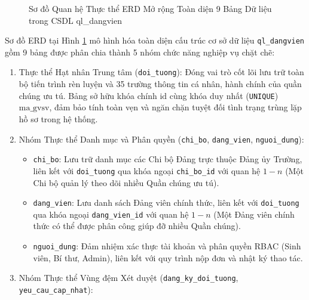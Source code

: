 \documentclass[12pt,a4paper]{report}
\begin{document}
\begin{figure}[htbp]
\begin{minipage}{\linewidth}
{}
    \vspace{0.3em}
  \end{minipage}
  \caption{Sơ đồ Quan hệ Thực thể ERD Mở rộng Toàn diện 9 Bảng Dữ liệu trong CSDL ql\_dangvien}
  \label{fig:erd_9_tables}
\end{figure}
Sơ đồ ERD tại Hình \ref{fig:erd_9_tables} mô hình hóa toàn diện cấu trúc cơ sở dữ liệu \texttt{ql\_dangvien} gồm 9 bảng được phân chia thành 5 nhóm chức năng nghiệp vụ chặt chẽ:
\begin{enumerate}[label=\arabic*.]
  \item Thực thể Hạt nhân Trung tâm (\texttt{doi\_tuong}): Đóng vai trò cốt lõi lưu trữ toàn bộ tiến trình rèn luyện và 35 trường thông tin cá nhân, hành chính của quần chúng ưu tú. Bảng sở hữu khóa chính $\text{id}$ cùng khóa duy nhất (\texttt{UNIQUE}) $\text{ma\_gvsv}$, đảm bảo tính toàn vẹn và ngăn chặn tuyệt đối tình trạng trùng lặp hồ sơ trong hệ thống.
  \item Nhóm Thực thể Danh mục và Phân quyền (\texttt{chi\_bo}, \texttt{dang\_vien}, \texttt{nguoi\_dung}):
        \begin{itemize}[label=--,leftmargin=*]
          \item \texttt{chi\_bo}: Lưu trữ danh mục các Chi bộ Đảng trực thuộc Đảng ủy Trường, liên kết với \texttt{doi\_tuong} qua khóa ngoại \texttt{chi\_bo\_id} với quan hệ $1 - n$ (Một Chi bộ quản lý theo dõi nhiều Quần chúng ưu tú).
          \item \texttt{dang\_vien}: Lưu danh sách Đảng viên chính thức, liên kết với \texttt{doi\_tuong} qua khóa ngoại \texttt{dang\_vien\_id} với quan hệ $1 - n$ (Một Đảng viên chính thức có thể được phân công giúp đỡ nhiều Quần chúng).
          \item \texttt{nguoi\_dung}: Đảm nhiệm xác thực tài khoản và phân quyền RBAC (Sinh viên, Bí thư, Admin), liên kết với quy trình nộp đơn và nhật ký thao tác.
        \end{itemize}
  \item Nhóm Thực thể Vùng đệm Xét duyệt (\texttt{dang\_ky\_doi\_tuong}, \texttt{yeu\_cau\_cap\_nhat}):
        \begin{itemize}[label=--,leftmargin=*]

\end{itemize}
\end{enumerate}
\end{document}
